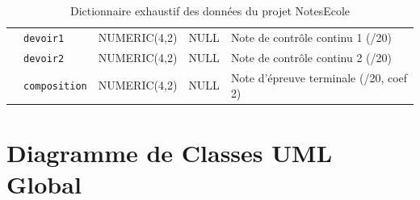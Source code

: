 \documentclass[11pt,a4paper,oneside]{report}
\begin{document}
\begin{table}[H]
\begin{tabularx}{\textwidth}{llllX}
        & \texttt{devoir1} & NUMERIC(4,2) & NULL & Note de contrôle continu 1 (/20) \\
        & \texttt{devoir2} & NUMERIC(4,2) & NULL & Note de contrôle continu 2 (/20) \\
        & \texttt{composition} & NUMERIC(4,2) & NULL & Note d'épreuve terminale (/20, coef 2) \\
        \bottomrule
    \end{tabularx}
    \caption{Dictionnaire exhaustif des données du projet NotesEcole}
    \label{tab:dictionnaire_donnees}
\end{table}

\chapter{Diagramme de Classes UML Global}
\label{anx:uml}
\end{document}
